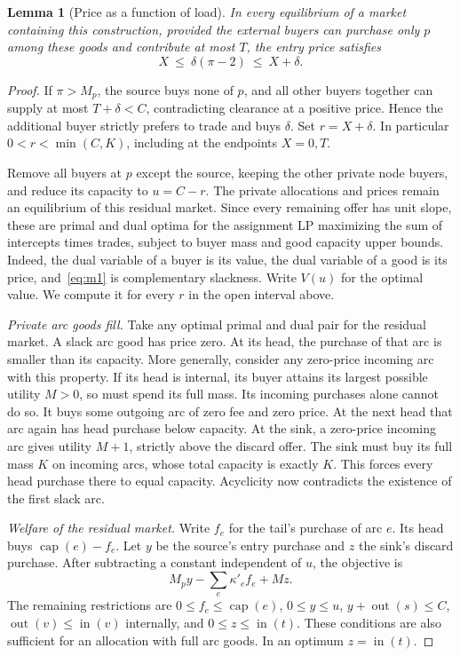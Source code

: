 \documentclass[11pt]{article}
\newtheorem{lemma}[theorem]{Lemma}
\DeclareMathOperator{\caparc}{cap}
\begin{document}
\begin{lemma}[Price as a function of load]\label{lem:price}
In every equilibrium of a market containing this construction, provided
the external buyers can purchase only \(p\) among these goods and contribute
at most \(T\), the entry price satisfies
\[
                         X\ \le\ \delta(\pi-2)\ \le\ X+\delta .
\]
\end{lemma}
\begin{proof}
If \(\pi>M_p\), the source buys none of \(p\), and all other buyers together
can supply at most \(T+\delta<C\), contradicting clearance at a positive
price. Hence the additional buyer strictly prefers to trade and buys
\(\delta\). Set \(r=X+\delta\). In particular
\(0<r<\min(C,K)\), including at the endpoints \(X=0,T\).

Remove all buyers at \(p\) except the source, keeping the other private node
buyers, and reduce its capacity to \(u=C-r\). The private allocations and
prices remain an equilibrium of this residual market. Since every remaining
offer has unit slope, these are primal and dual optima for the assignment
LP maximizing the sum of intercepts times trades, subject to buyer mass and
good capacity upper bounds. Indeed, the dual variable of a buyer is its
value, the dual variable of a good is its price, and~\eqref{eq:m1} is
complementary slackness. Write \(V(u)\) for the optimal value. We compute
it for every \(r\) in the open interval above.

\emph{Private arc goods fill.}
Take any optimal primal and dual pair for the residual market. A slack arc
good has price zero. At its head, the purchase of that arc is smaller than
its capacity. More generally, consider any zero-price incoming arc with this
property. If its head is internal, its buyer attains its largest possible
utility \(M>0\), so must spend its full mass. Its incoming purchases alone
cannot do so. It buys some outgoing arc of zero fee and zero price. At the
next head that arc again has head purchase below capacity. At the sink, a
zero-price incoming arc gives utility \(M+1\), strictly above the discard
offer. The sink must buy its full mass \(K\) on incoming arcs, whose total
capacity is exactly \(K\). This forces every head purchase there to equal
capacity. Acyclicity now contradicts the existence of the first slack arc.

\emph{Welfare of the residual market.}
Write \(f_e\) for the tail's purchase of arc \(e\). Its head buys
\(\caparc(e)-f_e\). Let \(y\) be the source's entry purchase and \(z\) the
sink's discard purchase. After subtracting a constant independent of \(u\),
the objective is
\[
                M_p y-\sum_e\kappa'_e f_e+Mz .
\]
The remaining restrictions are \(0\le f_e\le\caparc(e)\),
\(0\le y\le u\), \(y+\operatorname{out}(s)\le C\),
\(\operatorname{out}(v)\le\operatorname{in}(v)\) internally, and
\(0\le z\le\operatorname{in}(t)\). These conditions are also sufficient
for an allocation with full arc goods. In an optimum
\(z=\operatorname{in}(t)\).


\end{proof}
\end{document}
